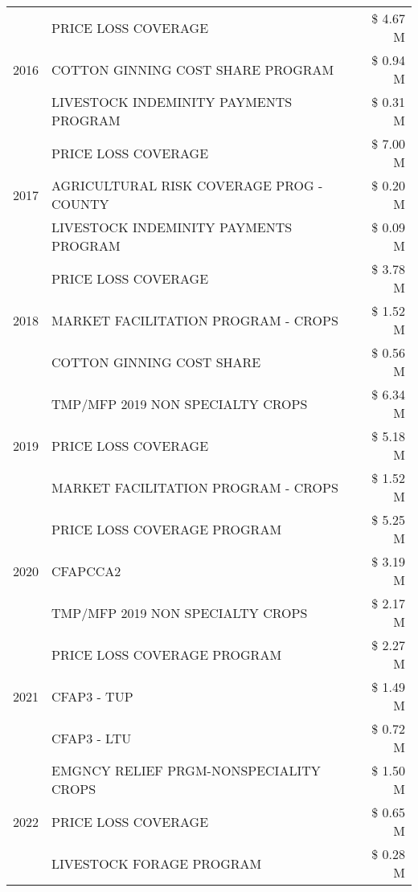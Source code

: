 \begin{tabular}{llr}
\cline{1-3}
\multirow[t]{3}{*}{2016} & PRICE LOSS COVERAGE & \$ 4.67 M \\
 & COTTON GINNING COST SHARE PROGRAM & \$ 0.94 M \\
 & LIVESTOCK INDEMINITY PAYMENTS PROGRAM & \$ 0.31 M \\
\cline{1-3}
\multirow[t]{3}{*}{2017} & PRICE LOSS COVERAGE & \$ 7.00 M \\
 & AGRICULTURAL RISK COVERAGE PROG - COUNTY & \$ 0.20 M \\
 & LIVESTOCK INDEMINITY PAYMENTS PROGRAM & \$ 0.09 M \\
\cline{1-3}
\multirow[t]{3}{*}{2018} & PRICE LOSS COVERAGE & \$ 3.78 M \\
 & MARKET FACILITATION PROGRAM - CROPS & \$ 1.52 M \\
 & COTTON GINNING COST SHARE & \$ 0.56 M \\
\cline{1-3}
\multirow[t]{3}{*}{2019} & TMP/MFP 2019 NON SPECIALTY CROPS & \$ 6.34 M \\
 & PRICE LOSS COVERAGE & \$ 5.18 M \\
 & MARKET FACILITATION PROGRAM - CROPS & \$ 1.52 M \\
\cline{1-3}
\multirow[t]{3}{*}{2020} & PRICE LOSS COVERAGE PROGRAM & \$ 5.25 M \\
 & CFAPCCA2 & \$ 3.19 M \\
 & TMP/MFP 2019 NON SPECIALTY CROPS & \$ 2.17 M \\
\cline{1-3}
\multirow[t]{3}{*}{2021} & PRICE LOSS COVERAGE PROGRAM & \$ 2.27 M \\
 & CFAP3 - TUP & \$ 1.49 M \\
 & CFAP3 - LTU & \$ 0.72 M \\
\cline{1-3}
\multirow[t]{3}{*}{2022} & EMGNCY RELIEF PRGM-NONSPECIALITY CROPS & \$ 1.50 M \\
 & PRICE LOSS COVERAGE & \$ 0.65 M \\
 & LIVESTOCK FORAGE PROGRAM & \$ 0.28 M \\
\cline{1-3}
\bottomrule
\end{tabular}
